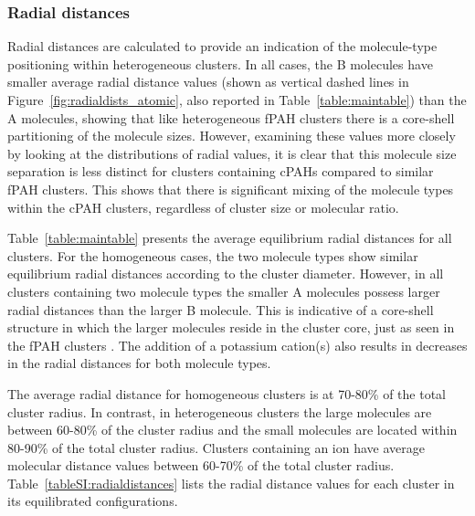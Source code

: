 \subsubsection{Radial distances}


Radial distances are calculated to provide an indication of the molecule-type positioning within heterogeneous clusters. In all cases, the B molecules have smaller average radial distance values (shown as vertical dashed lines in Figure~\ref{fig:radialdists_atomic}, also reported in Table~\ref{table:maintable}) than the A molecules, showing that like heterogeneous fPAH clusters \cite{bowal2018partitioning} there is a core-shell partitioning of the molecule sizes. 
However, examining these values more closely by looking at the distributions of radial values, it is clear that this molecule size separation is less distinct for clusters containing cPAHs compared to similar fPAH clusters. This shows that there is significant mixing of the molecule types within the cPAH clusters, regardless of cluster size or molecular ratio.

Table~\ref{table:maintable} presents the average equilibrium radial distances for all clusters. For the homogeneous cases, the two molecule types show similar equilibrium radial distances according to the cluster diameter. However, in all clusters containing two molecule types the smaller A molecules possess larger radial distances than the larger B molecule. This is indicative of a core-shell structure in which the larger molecules reside in the cluster core, just as seen in the fPAH clusters \cite{bowal2018partitioning}.
The addition of a potassium cation(s) also results in decreases in the radial distances for both molecule types.

The average radial distance for homogeneous clusters is at 70-80\% of the total cluster radius. In contrast, in heterogeneous clusters the large molecules are between 60-80\% of the cluster radius and the small molecules are located within 80-90\% of the total cluster radius.  Clusters containing an ion have average molecular distance values between 60-70\% of the total cluster radius. %
Table~\ref{tableSI:radialdistances} lists the radial distance values for each cluster in its equilibrated configurations.

